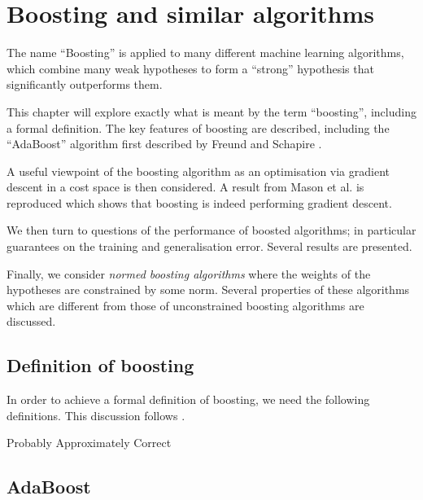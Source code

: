 



\newtheorem{theorem}{Theorem}


\chapter{Boosting and similar algorithms}

The name ``Boosting'' is applied to many different machine learning
algorithms, which combine many weak hypotheses to form a ``strong''
hypothesis that significantly outperforms them.

This chapter will explore exactly what is meant by the term
``boosting'', including a formal definition.  The key features of
boosting are described, including the ``AdaBoost'' algorithm first
described by Freund and Schapire \cite{Freund96}.

A useful viewpoint of the boosting algorithm as an optimisation via
gradient descent in a cost space is then considered.  A result from
Mason et al. \cite{Mason99} is reproduced which shows that boosting is
indeed performing gradient descent.

We then turn to questions of the performance of boosted algorithms; in
particular guarantees on the training and generalisation error.
Several results are presented.

Finally, we consider \emph{normed boosting algorithms} where the
weights of the hypotheses are constrained by some norm.  Several
properties of these algorithms which are different from those of
unconstrained boosting algorithms are discussed.






\section{Definition of boosting}

In order to achieve a formal definition of boosting, we need the
following definitions.  This discussion follows \cite{Duffy99}.

Probably Approximately Correct



\section{AdaBoost}

